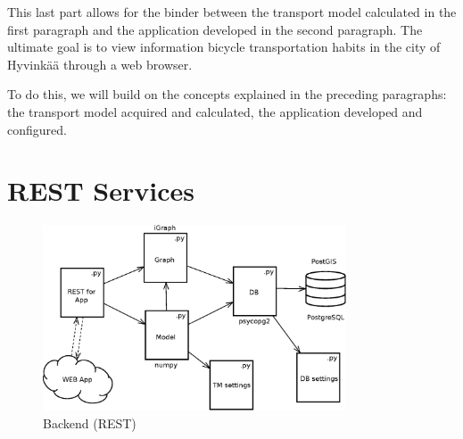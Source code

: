 

This last part allows for the binder between the transport model calculated in the first paragraph and the application developed in the second paragraph. The ultimate goal is to view information bicycle transportation habits in the city of Hyvinkää through a web browser. 

To do this, we will build on the concepts explained in the preceding paragraphs: the transport model acquired and calculated, the application developed and configured.


\section{REST Services}

\begin{figure}
  \centering
  \includegraphics[width=9cm]{img/c01-transp-model/backend.eps}
  \caption{Backend (REST)}
  \label{img.asas}
\end{figure}



